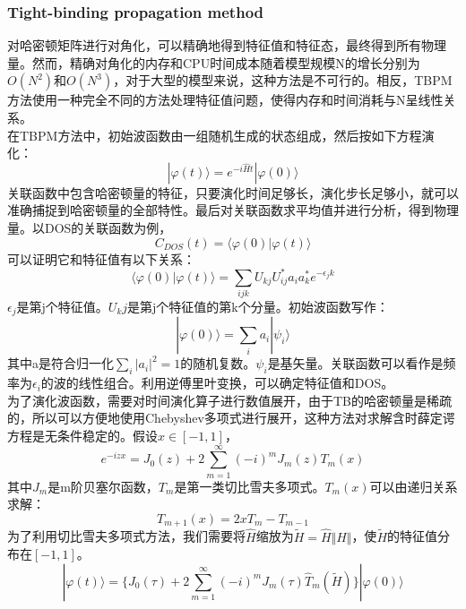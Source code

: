 \subsubsection{Tight-binding propagation method}
对哈密顿矩阵进行对角化，可以精确地得到特征值和特征态，最终得到所有物理量。然而，精确对角化的内存和CPU时间成本随着模型规模N的增长分别为$O(N^2)$和$O(N^3)$，对于大型的模型来说，这种方法是不可行的。相反，TBPM方法使用一种完全不同的方法处理特征值问题，使得内存和时间消耗与N呈线性关系。\\
在TBPM方法中，初始波函数由一组随机生成的状态组成，然后按如下方程演化：
\begin{equation}
    |\varphi(t)\rangle =e^{-i\hat{H}t}|\varphi(0)\rangle
\end{equation}
关联函数中包含哈密顿量的特征，只要演化时间足够长，演化步长足够小，就可以准确捕捉到哈密顿量的全部特性。最后对关联函数求平均值并进行分析，得到物理量。以DOS的关联函数为例，
\begin{equation}
    C_{DOS}(t)=\langle\varphi(0)|\varphi(t)\rangle
\end{equation}
可以证明它和特征值有以下关系：
\begin{equation}
    \langle\varphi(0)|\varphi(t)\rangle=\sum_{ijk}U_{kj}U_{ij}^{*}a_ia^{*}_{k}e^{-\epsilon_jk}
\end{equation}
$\epsilon_j$是第j个特征值。$U_kj$是第j个特征值的第k个分量。初始波函数写作：
\begin{equation}
    |\varphi(0)\rangle=\sum_{i}a_i|\psi_i\rangle
\end{equation}
其中a是符合归一化$\sum_i |a_i|^2=1$的随机复数。$\psi_i$是基矢量。关联函数可以看作是频率为$\epsilon_i$的波的线性组合。利用逆傅里叶变换，可以确定特征值和DOS。\\
为了演化波函数，需要对时间演化算子进行数值展开，由于TB的哈密顿量是稀疏的，所以可以方便地使用Chebyshev多项式进行展开，这种方法对求解含时薛定谔方程是无条件稳定的。假设$x\in[-1,1]$，
\begin{equation}
    e^{-izx}=J_0(z)+2\sum_{m=1}^{\infty}(-i)^mJ_m(z)T_m(x)
\end{equation}
其中$J_m$是m阶贝塞尔函数，$T_m$是第一类切比雪夫多项式。$T_m(x)$可以由递归关系求解：
\begin{equation}
    T_{m+1}(x)=2xT_{m}-T_{m-1}
\end{equation}
为了利用切比雪夫多项式方法，我们需要将$\hat{H}$缩放为$\tilde{H}=\hat{H}\Vert H\Vert$，使$\tilde{H}$的特征值分布在$[-1,1]$。
\begin{equation}
    |\varphi(t)\rangle=\{J_0(\tau)+2\sum_{m=1}^{\infty}(-i)^mJ_m(\tau)\hat{T}_m(\tilde{H})\}|\varphi(0)\rangle
\end{equation}
